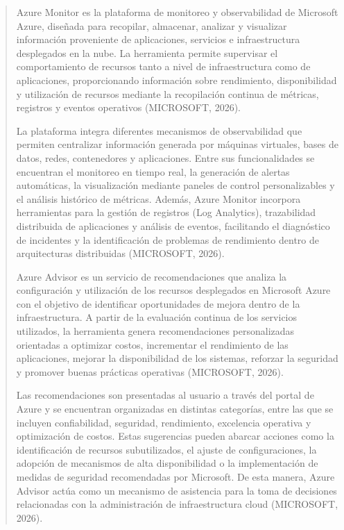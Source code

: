 \documentclass[
]{article}
\begin{document}
\begin{quote}
Azure Monitor es la plataforma de monitoreo y observabilidad de
Microsoft Azure, diseñada para recopilar, almacenar, analizar y
visualizar información proveniente de aplicaciones, servicios e
infraestructura desplegados en la nube. La herramienta permite
supervisar el comportamiento de recursos tanto a nivel de
infraestructura como de aplicaciones, proporcionando información sobre
rendimiento, disponibilidad y utilización de recursos mediante la
recopilación continua de métricas, registros y eventos operativos
(MICROSOFT, 2026).

La plataforma integra diferentes mecanismos de observabilidad que
permiten centralizar información generada por máquinas virtuales, bases
de datos, redes, contenedores y aplicaciones. Entre sus funcionalidades
se encuentran el monitoreo en tiempo real, la generación de alertas
automáticas, la visualización mediante paneles de control
personalizables y el análisis histórico de métricas. Además, Azure
Monitor incorpora herramientas para la gestión de registros (Log
Analytics), trazabilidad distribuida de aplicaciones y análisis de
eventos, facilitando el diagnóstico de incidentes y la identificación de
problemas de rendimiento dentro de arquitecturas distribuidas
(MICROSOFT, 2026).

Azure Advisor es un servicio de recomendaciones que analiza la
configuración y utilización de los recursos desplegados en Microsoft
Azure con el objetivo de identificar oportunidades de mejora dentro de
la infraestructura. A partir de la evaluación continua de los servicios
utilizados, la herramienta genera recomendaciones personalizadas
orientadas a optimizar costos, incrementar el rendimiento de las
aplicaciones, mejorar la disponibilidad de los sistemas, reforzar la
seguridad y promover buenas prácticas operativas (MICROSOFT, 2026).

Las recomendaciones son presentadas al usuario a través del portal de
Azure y se encuentran organizadas en distintas categorías, entre las que
se incluyen confiabilidad, seguridad, rendimiento, excelencia operativa
y optimización de costos. Estas sugerencias pueden abarcar acciones como
la identificación de recursos subutilizados, el ajuste de
configuraciones, la adopción de mecanismos de alta disponibilidad o la
implementación de medidas de seguridad recomendadas por Microsoft. De
esta manera, Azure Advisor actúa como un mecanismo de asistencia para la
toma de decisiones relacionadas con la administración de infraestructura
cloud (MICROSOFT, 2026).


\end{quote}
\end{document}
